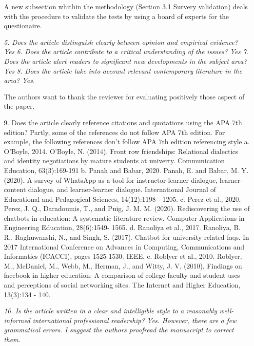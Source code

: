 \documentclass{letter}
\begin{document}
A new subsection whithin the methodology (Section 3.1 Survery validation) deals with the procedure to validate the tests by using a board of experts for the questionaire.



{\it 5.      Does the article distinguish clearly between opinion and empirical evidence? Yes
6.      Does the article contribute to a critical understanding of the issues? Yes
7.      Does the article alert readers to significant new developments in the subject area? Yes
8.      Does the article take into account relevant contemporary literature in the area? Yes.}

The authors want to thank the reviewer for evaluating positively those aspect of the paper.


9.      Does the article clearly reference citations and quotations using the APA 7th edition? Partly, some of the references do not follow APA 7th edition. For example, the following references don't follow APA 7th edition referencing style
     a.   O'Boyle, 2014. O'Boyle, N. (2014). Front row friendships: Relational dialectics and identity negotiations by mature students at univerty. Communication Education, 63(3):169-191
     b. Panah and Babar, 2020. Panah, E. and Babar, M. Y. (2020). A survey of WhatsApp as a tool for instructor-learner dialogue, learner-content dialogue, and learner-learner dialogue. International Journal of Educational and Pedagogical
 Sciences, 14(12):1198 - 1205.
     c. Perez et al., 2020. Perez, J. Q., Daradoumis, T., and Puig, J. M. M. (2020). Rediscovering the use of chatbots in education: A systematic literature review. Computer Applications in Engineering Education, 28(6):1549- 1565.
     d. Ranoliya et al., 2017. Ranoliya, B. R., Raghuwanshi, N., and Singh, S. (2017). Chatbot for university related faqs. In 2017 International Conference on Advances in Computing, Communications and Informatics (ICACCI), pages 1525-1530. IEEE.
     e. Roblyer et al., 2010. Roblyer, M., McDaniel, M., Webb, M., Herman, J., and Witty, J. V. (2010). Findings on facebook in higher education: A comparison of college faculty and student uses and perceptions of social networking sites. The Internet and Higher Education, 13(3):134 - 140.


{\it 10.     Is the article written in a clear and intelligible style to a reasonably well-informed international professional readership? Yes. However, there are a few grammatical errors. I suggest the authors proofread the manuscript to correct them.}
\end{document}
